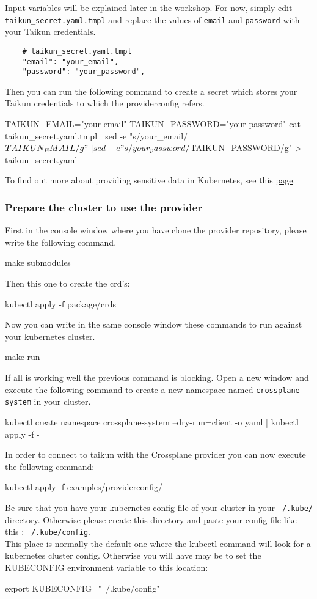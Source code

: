 Input variables will be explained later in the workshop.
For now, simply edit \texttt{taikun\_secret.yaml.tmpl}
and replace the values of \texttt{email} and \texttt{password}
with your Taikun credentials.
\begin{verbatim}
    # taikun_secret.yaml.tmpl
    "email": "your_email",
    "password": "your_password",
\end{verbatim}

Then you can run the following command to create a secret which stores your Taikun credentials to which the providerconfig refers.
\begin{shell}
TAIKUN_EMAIL="your-email"
TAIKUN_PASSWORD="your-password"
cat taikun_secret.yaml.tmpl | sed -e "s/your_email/${TAIKUN_EMAIL}/g" \
| sed -e "s/your_password/${TAIKUN_PASSWORD}/g" > taikun_secret.yaml
\end{shell}

To find out more about providing sensitive data in Kubernetes, see this \href{https://kubernetes.io/docs/concepts/configuration/secret/}{page}.

\subsubsection{Prepare the cluster to use the provider}
First in the console window where you have clone the provider repository, please write the following command.
\begin{shell}
make submodules
\end{shell}
Then this one to create the crd's:
\begin{shell}
kubectl apply -f package/crds
\end{shell}
Now you can write in the same console window these commands to run against your kubernetes cluster.
\begin{shell}
make run
\end{shell}
If all is working well the previous command is blocking. 
Open a new window and execute the following command to create a new namespace named \texttt{crossplane-system} in your cluster.
\begin{shell}
kubectl create namespace crossplane-system --dry-run=client -o yaml | kubectl apply -f -
\end{shell}
In order to connect to taikun with the Crossplane provider you can now execute the following command:
\begin{shell}
kubectl apply -f examples/providerconfig/
\end{shell}
\begin{warn}
Be sure that you have your kubernetes config file of your cluster in your \texttt{~/.kube/} directory. Otherwise please create this directory and paste your config file like this : \texttt{~/.kube/config}.\\
This place is normally the default one where the kubectl command will look for a kubernetes cluster config. Otherwise you will have may be to set the KUBECONFIG environment variable to this location:
\begin{shell}
export KUBECONFIG="~/.kube/config"
\end{shell}
\end{warn}